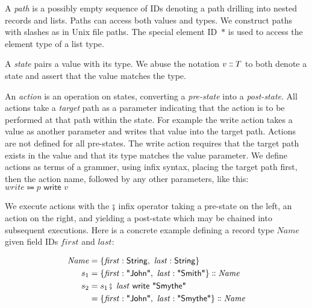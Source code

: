 \documentclass[english,submission]{programming}
\theoremstyle{definition}
\newcommand{\mathbox}[1]{\colorbox{black!10}{$#1$}}
\DeclareMathOperator{\exec}{\fatsemi\ }
\newcommand{\isa}{\dblcolon}
\newcommand{\quotedstring}[1]{\textsf{\textquotedbl{#1}\textquotedbl}}
\begin{document}
A \textit{path} is a possibly empty sequence of IDs denoting a path drilling into nested records and lists. Paths can access both values and types. We construct paths with slashes as in Unix file paths. The special element ID~\mathbox{*} is used to access the element type of a list type.

A \textit{state} pairs a value with its type. We abuse the notation \mathbox{v \isa T} to both denote a state and assert that the value matches the type.

An \textit{action} is an operation on states, converting a \textit{pre-state} into a \textit{post-state}.
All actions take a \textit{target} path as a parameter indicating that the action is to be performed at that path within the state.
For example the \textsf{write} action takes a value as another parameter and writes that value into the target path. Actions are not defined for all pre-states. The \textsf{write} action requires that the target path exists in the value and that its type matches the value parameter. We define actions as terms of a grammer,
using infix syntax, placing the target path first, then the action name, followed by any other parameters, like this:
\mathbox{\mathit{write} \Coloneqq p \textsf{ write } v}

We execute actions with the \mathbox{\fatsemi} infix operator taking a pre-state on the left, an action on the right, and yielding a post-state which may be chained into subsequent executions. Here is a concrete example defining a record type \mathbox{\mathit{Name}} given field IDs \mathbox{\mathit{first}} and \mathbox{\mathit{last}}:

\begin{align*}
\mathit{Name} &= \{\mathit{first}  : \textsf{String},\  \mathit{last} : \textsf{String}\}\\
s_1 &= \{\mathit{first}: \quotedstring{John},\  \mathit{last}: \quotedstring{Smith}\} \isa \mathit{Name}\\
s_2 &= s_1 \exec \mathit{last} \textsf{ write } \quotedstring{Smythe}\\
&= \{\mathit{first}: \quotedstring{John},\  \mathit{last}: \quotedstring{Smythe}\} \isa \mathit{Name}\\
\end{align*}
\end{document}
